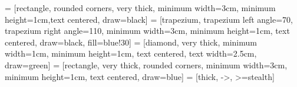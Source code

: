 \usepackage{times}
\usepackage{lmodern}
\usepackage{multirow}
\usepackage[T1]{fontenc}

\usepackage{amsmath,amsthm,mathrsfs,amssymb,amsfonts,dsfont,nicefrac,stmaryrd,yhmath}
\usepackage{mathtools,cancel,multicol}

\usepackage{csquotes} 
\usepackage{layout}
\usepackage{cite} %
\usepackage{subcaption}
\usepackage{tikz,pgfplots}
\pgfplotsset{compat=newest}
\usepackage{pgfmath,pgffor}
\usetikzlibrary{plotmarks}
\usepackage{pgfplotstable}
\usetikzlibrary{arrows,positioning,shapes} 
\usepackage{animate}
\usepackage{subcaption}
\usepackage{pgfpages}
\usepackage{changepage}
\usepackage{xstring}
\usepackage{soul}


\newsavebox\foobox
\newcommand\slbox[2]{%
	\FPdiv{\result}{#1}{57.296}%
	\FPtan{\result}{\result}%
	\slantbox[\result]{#2}%
}%
\newcommand{\slantbox}[2][30]{%
	\scalebox{1}[.7]{\mbox{%
			\sbox{\foobox}{#2}%
			\hskip\wd\foobox
			\pdfsave
			\pdfsetmatrix{1 0 #1 1}%
			\llap{\usebox{\foobox}}%
			\pdfrestore
}}}
\newcommand\rotslant[3]{\rotatebox{#1}{\slbox{#2}{#3}}}

\usetikzlibrary{calc,intersections,through,backgrounds,arrows,positioning,shapes.geometric}

 = [rectangle, rounded corners, very thick, minimum width=3cm, minimum height=1cm,text centered, draw=black]%
 = [trapezium, trapezium left angle=70, trapezium right angle=110, minimum width=3cm, minimum height=1cm, text centered, draw=black, fill=blue!30]
 = [diamond, very thick, minimum width=1cm, minimum height=1cm, text centered, text width=2.5cm, draw=green]%
 = [rectangle, very thick, rounded corners, minimum width=3cm, minimum height=1cm, text centered, draw=blue] %
 = [thick, ->, >=stealth]


